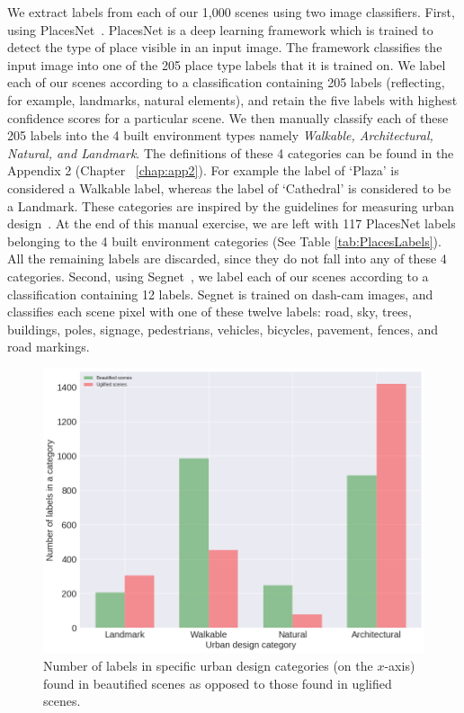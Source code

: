 We extract labels from each of our 1,000 scenes using two image classifiers. First, using PlacesNet~\cite{zhou2014learning}. PlacesNet is a deep learning framework which is trained to detect the type of place visible in an input image. 
The framework classifies the input image into one of the 205 place type labels that it is trained on. We label each of our scenes according to a classification containing 205 labels (reflecting, for example, landmarks, natural elements), and retain the five labels with highest confidence scores for a particular scene. 
We then manually classify each of these 205 labels into the 4 built environment types namely \textit{Walkable, Architectural, Natural, and Landmark}. The definitions of these 4 categories can be found in the Appendix 2 (Chapter ~\ref{chap:app2}). For example the label of `Plaza' is considered a Walkable label, whereas the label of `Cathedral' is considered to be a Landmark. These categories are inspired by the guidelines for measuring urban design~\cite{ewing2013measuring}. At the end of this manual exercise, we are left with 117 PlacesNet labels belonging to the 4 built environment categories (See Table \ref{tab:PlacesLabels}). All the remaining labels are discarded, since they do not fall into any of these 4 categories. Second, using Segnet~\cite{badrinarayanan2015segnet}, we  label each of our scenes according to a classification containing 12 labels. Segnet is trained on dash-cam images, and classifies each scene pixel with one of these twelve labels: road, sky, trees,  buildings, poles, signage, pedestrians, vehicles, bicycles, pavement, fences, and road markings. 

\begin{figure}[h]
    \centering
    \includegraphics[width=\columnwidth]{taxonomyCount.png}
    \caption{Number of labels in specific urban design categories (on the $x$-axis) found in beautified scenes as opposed to those found in uglified scenes.}
    \label{fig:taxonomyCount}
\end{figure}


